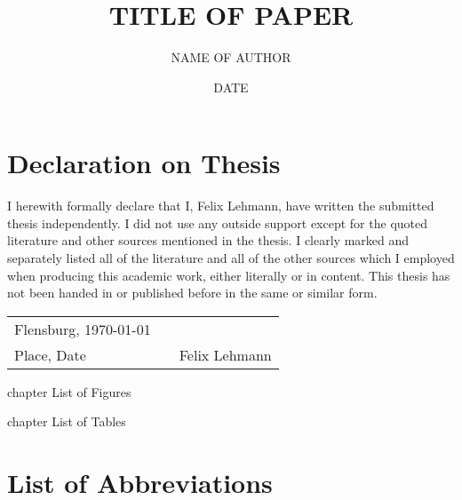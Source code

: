 \documentclass[a4paper, 12pt, bibtotoc, toc=chapterentrywithdots, hyphens]{scrreprt}
\title{TITLE OF PAPER}
\author{NAME OF AUTHOR}
\date{DATE}
\begin{document}
\pagestyle{empty}



\chapter*{Declaration on Thesis}
\thispagestyle{Preamble}

I herewith formally declare that I, Felix Lehmann, have written the submitted thesis independently. I did not use any outside support except for the quoted literature and other sources mentioned in the thesis. I clearly marked and separately listed all of the literature and all of the other sources which I employed when producing this academic work, either literally or in content. This thesis has not been handed in or published before in the same or similar form.

\vspace{4cm}

\begin{tabular}[h]{l p{2cm} p{7cm}}
Flensburg, \today &  & \\
\cline{1-1}\cline{3-3}
{\small Place, Date}& & {\small Felix Lehmann}\\
\end{tabular}


\newpage
{}
\tableofcontents
\thispagestyle{Preamble}

\newpage
\listoffigures
\thispagestyle{Preamble}
 {chapter} {List of Figures}

\newpage
\listoftables
\thispagestyle{Preamble}
 {chapter} {List of Tables}

\newpage
\chapter*{List of Abbreviations}
\thispagestyle{Preamble}
\printglossary[type=\acronymtype, style=long]
\end{document}
